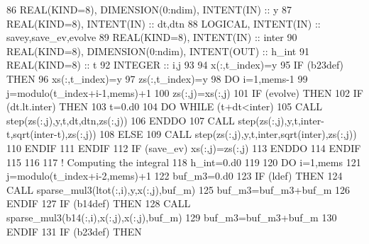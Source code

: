 \begin{DoxyCode}
86     \textcolor{keywordtype}{REAL(KIND=8)}, \textcolor{keywordtype}{DIMENSION(0:ndim)}, \textcolor{keywordtype}{INTENT(IN)} :: y
87     \textcolor{keywordtype}{REAL(KIND=8)}, \textcolor{keywordtype}{INTENT(IN)} :: dt,dtn
88     \textcolor{keywordtype}{LOGICAL}, \textcolor{keywordtype}{INTENT(IN)} :: savey,save\_ev,evolve
89     \textcolor{keywordtype}{REAL(KIND=8)}, \textcolor{keywordtype}{INTENT(IN)} :: inter 
90     \textcolor{keywordtype}{REAL(KIND=8)}, \textcolor{keywordtype}{DIMENSION(0:ndim)}, \textcolor{keywordtype}{INTENT(OUT)} :: h\_int
91     \textcolor{keywordtype}{REAL(KIND=8)} :: t
92     \textcolor{keywordtype}{INTEGER} :: i,j
93     
94     x(:,t\_index)=y
95     \textcolor{keywordflow}{IF} (b23def) \textcolor{keywordflow}{THEN}
96        xs(:,t\_index)=y
97        zs(:,t\_index)=y
98        \textcolor{keywordflow}{DO} i=1,mems-1
99           j=modulo(t\_index+i-1,mems)+1
100           zs(:,j)=xs(:,j)
101           \textcolor{keywordflow}{IF} (evolve) \textcolor{keywordflow}{THEN}
102              \textcolor{keywordflow}{IF} (dt.lt.inter) \textcolor{keywordflow}{THEN}
103                 t=0.d0
104                 \textcolor{keywordflow}{DO} \textcolor{keywordflow}{WHILE} (t+dt<inter)
105                    \textcolor{keyword}{CALL }step(zs(:,j),y,t,dt,dtn,zs(:,j))
106 \textcolor{keywordflow}{                ENDDO}
107                 \textcolor{keyword}{CALL }step(zs(:,j),y,t,inter-t,sqrt(inter-t),zs(:,j))
108              \textcolor{keywordflow}{ELSE}
109                 \textcolor{keyword}{CALL }step(zs(:,j),y,t,inter,sqrt(inter),zs(:,j))
110 \textcolor{keywordflow}{             ENDIF}
111 \textcolor{keywordflow}{          ENDIF}
112           \textcolor{keywordflow}{IF} (save\_ev) xs(:,j)=zs(:,j)
113 \textcolor{keywordflow}{       ENDDO}
114 \textcolor{keywordflow}{    ENDIF}
115     
116 
117     \textcolor{comment}{! Computing the integral}
118     h\_int=0.d0
119 
120     \textcolor{keywordflow}{DO} i=1,mems
121        j=modulo(t\_index+i-2,mems)+1
122        buf\_m3=0.d0
123        \textcolor{keywordflow}{IF} (ldef) \textcolor{keywordflow}{THEN}
124           \textcolor{keyword}{CALL }sparse\_mul3(ltot(:,i),y,x(:,j),buf\_m)
125           buf\_m3=buf\_m3+buf\_m
126 \textcolor{keywordflow}{       ENDIF}
127        \textcolor{keywordflow}{IF} (b14def) \textcolor{keywordflow}{THEN}
128           \textcolor{keyword}{CALL }sparse\_mul3(b14(:,i),x(:,j),x(:,j),buf\_m)
129           buf\_m3=buf\_m3+buf\_m
130 \textcolor{keywordflow}{       ENDIF}
131        \textcolor{keywordflow}{IF} (b23def) \textcolor{keywordflow}{THEN}

\end{DoxyCode}
